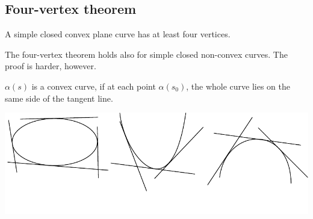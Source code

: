 \subsection{Four-vertex theorem}
\begin{theorem}\label{thm:four-vertex theorem}
    A simple closed convex plane curve has at least four vertices.
\end{theorem}
\begin{remark}
    The four-vertex theorem holds also for simple closed non-convex curves.
    The proof is harder, however.
\end{remark}
\begin{definition}
    $\alpha(s)$ is a convex curve, if at each point $\alpha(s_0)$, the whole curve lies on the same side of the tangent line.
\end{definition}
\includegraphics{picture/week3/def convex curves.pdf}
